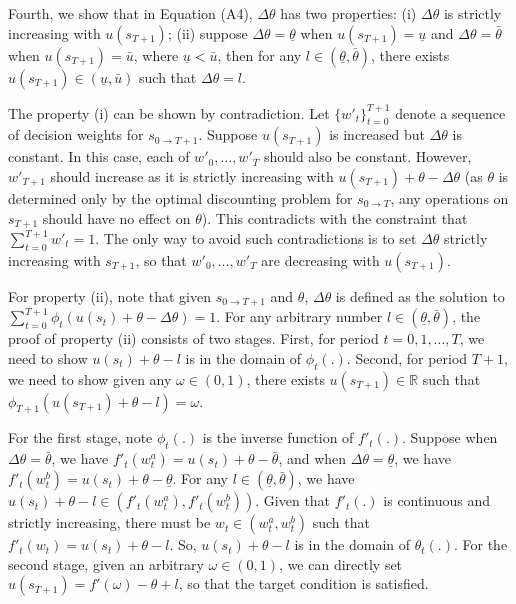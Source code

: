 Fourth, we show that in Equation (A4), \(\Delta \theta\) has two
properties: (i) \(\Delta \theta\) is strictly increasing with
\(u(s_{T+1})\); (ii) suppose \(\Delta \theta = \underline{\theta}\) when
\(u(s_{T+1})=\underline{u}\) and \(\Delta\theta=\bar{\theta}\) when
\(u(s_{T+1})=\bar{u}\), where \(\underline{u}<\bar{u}\), then for any
\(l \in(\underline{\theta},\bar{\theta})\), there exists
\(u(s_{T+1})\in(\underline{u},\bar{u})\) such that
\(\Delta \theta = l\).

The property (i) can be shown by contradiction. Let
\(\{w'_t\}_{t=0}^{T+1}\) denote a sequence of decision weights for
\(s_{0\rightarrow T+1}\). Suppose \(u(s_{T+1})\) is increased but
\(\Delta \theta\) is constant. In this case, each of \(w'_0,…,w'_T\)
should also be constant. However, \(w'_{T+1}\) should increase as it is
strictly increasing with \(u(s_{T+1})+\theta-\Delta \theta\) (as
\(\theta\) is determined only by the optimal discounting problem for
\(s_{0\rightarrow T}\), any operations on \(s_{T+1}\) should have no
effect on \(\theta\)). This contradicts with the constraint that
\(\sum_{t=0}^{T+1} w'_t =1\). The only way to avoid such contradictions
is to set \(\Delta \theta\) strictly increasing with \(s_{T+1}\), so
that \(w'_0,…,w'_T\) are decreasing with \(u(s_{T+1})\).

For property (ii), note that given \(s_{0\rightarrow T+1}\) and
\(\theta\), \(\Delta\theta\) is defined as the solution to
\(\sum_{t=0}^{T+1} \phi_t(u(s_t)+\theta-\Delta\theta)=1\). For any
arbitrary number \(l\in(\underline{\theta},\bar{\theta})\), the proof of
property (ii) consists of two stages. First, for period \(t=0,1,…,T\),
we need to show \(u(s_t)+\theta-l\) is in the domain of \(\phi_t(.)\).
Second, for period \(T+1\), we need to show given any
\(\omega\in(0,1)\), there exists \(u(s_{T+1})\in \mathbb{R}\) such that
\(\phi_{T+1}(u(s_{T+1})+\theta-l)=\omega\).

For the first stage, note \(\phi_t(.)\) is the inverse function of
\(f'_t(.)\). Suppose when \(\Delta\theta=\bar{\theta}\), we have
\(f'_t(w^{a}_t)=u(s_t)+\theta-\bar{\theta}\), and when
\(\Delta\theta=\underline{\theta}\), we have
\(f'_t(w^{b}_t)=u(s_t)+\theta-\underline{\theta}\). For any
\(l\in(\underline{\theta},\bar{\theta})\), we have
\(u(s_t)+\theta-l \in (f'_t(w^a_t),f'_t(w^b_t))\). Given that
\(f'_t(.)\) is continuous and strictly increasing, there must be
\(w_t\in(w^a_t,w^b_t)\) such that \(f'_t(w_t)=u(s_t)+\theta-l\). So,
\(u(s_t)+\theta-l\) is in the domain of \(\theta_t(.)\). For the second
stage, given an arbitrary \(\omega\in(0,1)\), we can directly set
\(u(s_{T+1})=f'(\omega)-\theta+l\), so that the target condition is
satisfied.

